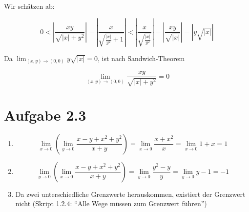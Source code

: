 \documentclass[a4paper,german,12pt,smallheadings]{scrartcl}
\begin{document}
Wir schätzen ab:

\begin{equation*}
  0 <
  \left| \frac{xy}{\sqrt{|x| + y^2}}          \right| =
  \left| \frac{x}{\sqrt{\frac{|x|}{y^2} + 1}} \right| <
  \left| \frac{x}{\sqrt{\frac{|x|}{y^2}}}     \right| =
  \left| \frac{xy}{\sqrt{|x|}}                \right| =
  \left| y\sqrt{|x|}                          \right|
\end{equation*}

Da $\lim_{(x,y) \to (0,0)} y\sqrt{|x|} = 0$, ist nach Sandwich-Theorem

\begin{equation*}
  \lim_{(x,y) \to (0,0)} \frac{xy}{\sqrt{|x| + y^2}} = 0
\end{equation*}

\section*{Aufgabe 2.3}

\begin{enumerate}[(1)]
  \item
    \begin{equation*}
      \lim_{x \to 0} \left( \lim_{y \to 0} \frac{x-y+x^2+y^2}{x+y} \right) =
      \lim_{x \to 0} \frac{x+x^2}{x}  =
      \lim_{x \to 0} 1+x =
      1
    \end{equation*}
  \item
    \begin{equation*}
      \lim_{y \to 0} \left( \lim_{x \to 0} \frac{x-y+x^2+y^2}{x+y} \right) =
      \lim_{y \to 0} \frac{y^2-y}{y} =
      \lim_{y \to 0} y-1 =
      -1
    \end{equation*}
  \item
    Da zwei unterschiedliche Grenzwerte herauskommen, existiert der Grenzwert
    nicht (Skript 1.2.4: ``Alle Wege müssen zum Grenzwert führen'')
\end{enumerate}
\end{document}
